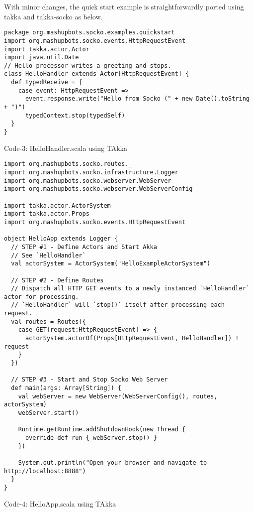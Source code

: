 \documentclass[11pt, a4paper]{article}
\begin{document}
With minor changes,  the quick start example is straightforwardly ported using takka and takka-socko as below.

\begin{lstlisting}
package org.mashupbots.socko.examples.quickstart
import org.mashupbots.socko.events.HttpRequestEvent
import takka.actor.Actor
import java.util.Date
// Hello processor writes a greeting and stops.
class HelloHandler extends Actor[HttpRequestEvent] {
  def typedReceive = { 
    case event: HttpRequestEvent =>
      event.response.write("Hello from Socko (" + new Date().toString + ")")
      typedContext.stop(typedSelf)
  }
}
\end{lstlisting}
\begin{center}{Code-3: HelloHandler.scala using TAkka}\end{center}


\begin{lstlisting}
import org.mashupbots.socko.routes._
import org.mashupbots.socko.infrastructure.Logger
import org.mashupbots.socko.webserver.WebServer
import org.mashupbots.socko.webserver.WebServerConfig

import takka.actor.ActorSystem 
import takka.actor.Props 
import org.mashupbots.socko.events.HttpRequestEvent

object HelloApp extends Logger {
  // STEP #1 - Define Actors and Start Akka
  // See `HelloHandler`
  val actorSystem = ActorSystem("HelloExampleActorSystem")

  // STEP #2 - Define Routes
  // Dispatch all HTTP GET events to a newly instanced `HelloHandler` actor for processing.
  // `HelloHandler` will `stop()` itself after processing each request.
  val routes = Routes({
    case GET(request:HttpRequestEvent) => {
      actorSystem.actorOf(Props[HttpRequestEvent, HelloHandler]) ! request
    }
  })

  // STEP #3 - Start and Stop Socko Web Server
  def main(args: Array[String]) {
    val webServer = new WebServer(WebServerConfig(), routes, actorSystem)
    webServer.start()

    Runtime.getRuntime.addShutdownHook(new Thread {
      override def run { webServer.stop() }
    })

    System.out.println("Open your browser and navigate to http://localhost:8888")
  }
}
\end{lstlisting}
\begin{center}{Code-4: HelloApp.scala using TAkka}\end{center}
\end{document}
